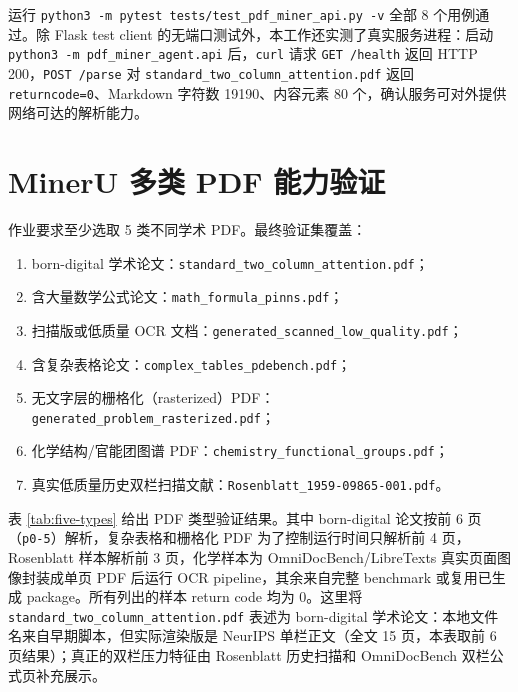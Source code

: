 \documentclass[UTF8,a4paper,11pt]{ctexart}
\begin{document}
运行 \texttt{python3 -m pytest tests/test\_pdf\_miner\_api.py -v} 全部 8 个用例通过。除 Flask test client 的无端口测试外，本工作还实测了真实服务进程：启动 \texttt{python3 -m pdf\_miner\_agent.api} 后，\texttt{curl} 请求 \texttt{GET /health} 返回 HTTP 200，\texttt{POST /parse} 对 \texttt{standard\_two\_column\_attention.pdf} 返回 \texttt{returncode=0}、Markdown 字符数 19190、内容元素 80 个，确认服务可对外提供网络可达的解析能力。

\section{MinerU 多类 PDF 能力验证}

作业要求至少选取 5 类不同学术 PDF。最终验证集覆盖：
\begin{enumerate}
  \item born-digital 学术论文：\texttt{standard\_two\_column\_attention.pdf}；
  \item 含大量数学公式论文：\texttt{math\_formula\_pinns.pdf}；
  \item 扫描版或低质量 OCR 文档：\texttt{generated\_scanned\_low\_quality.pdf}；
  \item 含复杂表格论文：\texttt{complex\_tables\_pdebench.pdf}；
  \item 无文字层的栅格化（rasterized）PDF：\texttt{generated\_problem\_rasterized.pdf}；
  \item 化学结构/官能团图谱 PDF：\texttt{chemistry\_functional\_groups.pdf}；
  \item 真实低质量历史双栏扫描文献：\texttt{Rosenblatt\_1959-09865-001.pdf}。
\end{enumerate}

表 \ref{tab:five-types} 给出 PDF 类型验证结果。其中 born-digital 论文按前 6 页（\texttt{p0-5}）解析，复杂表格和栅格化 PDF 为了控制运行时间只解析前 4 页，Rosenblatt 样本解析前 3 页，化学样本为 OmniDocBench/LibreTexts 真实页面图像封装成单页 PDF 后运行 OCR pipeline，其余来自完整 benchmark 或复用已生成 package。所有列出的样本 return code 均为 0。这里将 \texttt{standard\_two\_column\_attention.pdf} 表述为 born-digital 学术论文：本地文件名来自早期脚本，但实际渲染版是 NeurIPS 单栏正文（全文 15 页，本表取前 6 页结果）；真正的双栏压力特征由 Rosenblatt 历史扫描和 OmniDocBench 双栏公式页补充展示。
\end{document}
